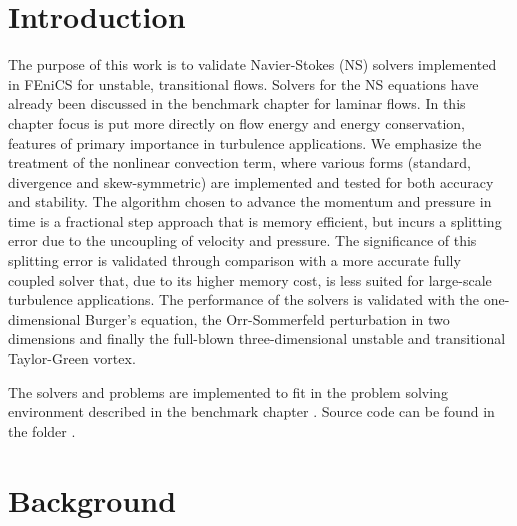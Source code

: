 
\renewcommand{\vec}[1]{\ensuremath{\mathbf{ #1 \xspace}}}
\newcommand{\Nset}{\ensuremath{\mathbb{N}}\xspace}
\newcommand{\Zset}{\ensuremath{\mathbb{Z}}\xspace}
\newcommand{\Qset}{\ensuremath{\mathbb{Q}}\xspace}
\newcommand{\Cset}{\ensuremath{\mathbb{C}}\xspace}
\newcommand{\Hset}{\ensuremath{\mathbb{H}}\xspace}



\section{Introduction}
The purpose of this work is to validate Navier-Stokes (NS) solvers implemented in FEniCS for unstable, transitional flows. Solvers for the NS equations have already been discussed in the benchmark chapter \cite{nsbench} for laminar flows. In this chapter focus is put more directly on flow energy and energy conservation, features of primary importance in turbulence applications. We emphasize the treatment of the nonlinear convection term, where various forms (standard, divergence and skew-symmetric) are implemented and tested for both accuracy and stability. The algorithm chosen to advance the momentum and pressure in time is a fractional step approach that is memory efficient, but incurs a splitting error due to the uncoupling of velocity and pressure. The significance of this splitting error is validated through comparison with a more accurate fully coupled solver that, due to its higher memory cost, is less suited for large-scale turbulence applications. The performance of the solvers is validated with the one-dimensional Burger's equation, the Orr-Sommerfeld perturbation in two dimensions and finally the full-blown three-dimensional unstable and transitional Taylor-Green vortex.

The solvers and problems are implemented to fit in the problem solving environment described in the benchmark chapter \cite{nsbench}. Source code can be found in the folder \cite{folder}.

\section{Background}

